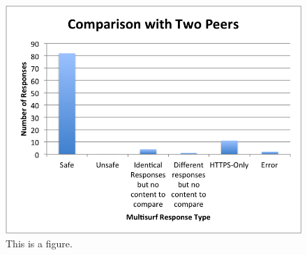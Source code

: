 \begin{figure}[htb]
\label{fig:peers}
\begin{center}
\includegraphics[width=\linewidth]{twopeers}
\caption{This is a figure.}
\end{center}
\end{figure}
